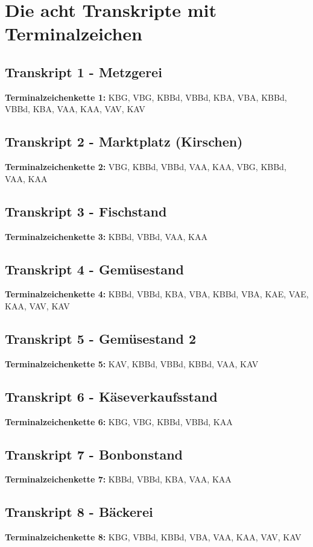 \documentclass[12pt,a4paper]{article}
\begin{document}
\newpage
\appendix
\section{Die acht Transkripte mit Terminalzeichen}

\subsection{Transkript 1 - Metzgerei}
\textbf{Terminalzeichenkette 1:} KBG, VBG, KBBd, VBBd, KBA, VBA, KBBd, VBBd, KBA, VAA, KAA, VAV, KAV

\subsection{Transkript 2 - Marktplatz (Kirschen)}
\textbf{Terminalzeichenkette 2:} VBG, KBBd, VBBd, VAA, KAA, VBG, KBBd, VAA, KAA

\subsection{Transkript 3 - Fischstand}
\textbf{Terminalzeichenkette 3:} KBBd, VBBd, VAA, KAA

\subsection{Transkript 4 - Gemüsestand}
\textbf{Terminalzeichenkette 4:} KBBd, VBBd, KBA, VBA, KBBd, VBA, KAE, VAE, KAA, VAV, KAV

\subsection{Transkript 5 - Gemüsestand 2}
\textbf{Terminalzeichenkette 5:} KAV, KBBd, VBBd, KBBd, VAA, KAV

\subsection{Transkript 6 - Käseverkaufsstand}
\textbf{Terminalzeichenkette 6:} KBG, VBG, KBBd, VBBd, KAA

\subsection{Transkript 7 - Bonbonstand}
\textbf{Terminalzeichenkette 7:} KBBd, VBBd, KBA, VAA, KAA

\subsection{Transkript 8 - Bäckerei}
\textbf{Terminalzeichenkette 8:} KBG, VBBd, KBBd, VBA, VAA, KAA, VAV, KAV
\end{document}
